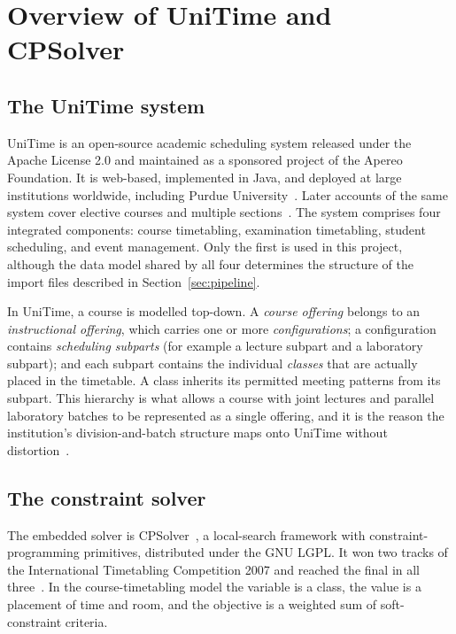 \section{Overview of UniTime and CPSolver}
\label{sec:unitime}

\subsection{The UniTime system}

UniTime is an open-source academic scheduling system released under the Apache
License 2.0 and maintained as a sponsored project of the Apereo Foundation. It is
web-based, implemented in Java, and deployed at large institutions worldwide, including Purdue
University~\cite{rudova2011complex}. Later accounts of the same system cover elective courses and
multiple sections~\cite{muller2016curriculum}. The system comprises four integrated components: course timetabling, examination
timetabling, student scheduling, and event management. Only the first is used in this project,
although the data model shared by all four determines the structure of the import files described
in Section~\ref{sec:pipeline}.

In UniTime, a course is modelled top-down. A \emph{course offering} belongs to an
\emph{instructional offering}, which carries one or more \emph{configurations}; a configuration
contains \emph{scheduling subparts} (for example a lecture subpart and a laboratory subpart); and
each subpart contains the individual \emph{classes} that are actually placed in the timetable. A
class inherits its permitted meeting patterns from its subpart. This hierarchy is what allows a
course with joint lectures and parallel laboratory batches to be represented as a single offering,
and it is the reason the institution's division-and-batch structure maps onto UniTime without
distortion~\cite{murray2007modeling}.

\subsection{The constraint solver}

The embedded solver is CPSolver~\cite{cpsolver}, a local-search framework with constraint-programming primitives,
distributed under the GNU LGPL. It won two tracks of the International Timetabling Competition 2007
and reached the final in all three~\cite{muller2009itc,muller2025itc}. In the course-timetabling model the variable is a class, the
value is a placement of time and room, and the objective is a weighted sum of soft-constraint
criteria.

